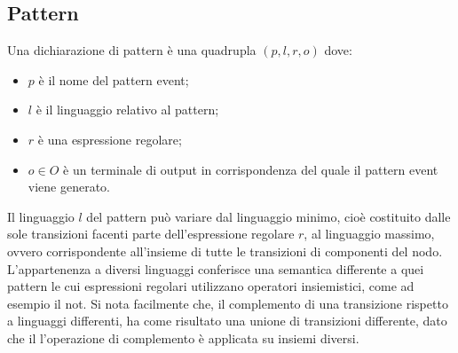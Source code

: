\subsection{Pattern}
Una dichiarazione di pattern è una quadrupla $(p,l,r,o)$ dove:
\begin{itemize}
\item $p$ è il nome del pattern event;
\item $l$ è il linguaggio relativo al pattern;
\item $r$ è una espressione regolare;
\item $o \in O$ è un terminale di output in corrispondenza del quale il pattern event viene generato.
\end{itemize}
Il linguaggio $l$ del pattern può variare dal linguaggio minimo, cioè costituito dalle sole transizioni facenti parte dell'espressione regolare $r$, al linguaggio massimo, ovvero corrispondente all'insieme di tutte le transizioni di componenti del nodo. L'appartenenza a diversi linguaggi conferisce una semantica differente a quei pattern le cui espressioni regolari utilizzano operatori insiemistici, come ad esempio il not. Si nota facilmente che, il complemento di una transizione rispetto a linguaggi differenti, ha come risultato una unione di transizioni differente, dato che il l'operazione di complemento è applicata su insiemi diversi.

